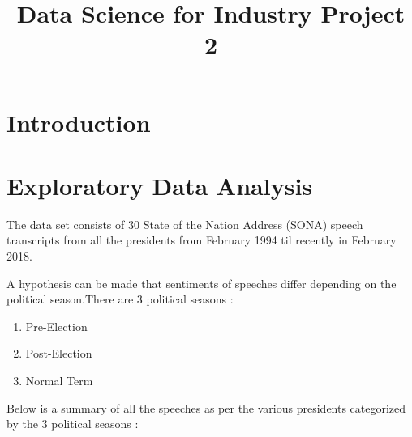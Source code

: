 \documentclass[]{article}
\title{Data Science for Industry Project 2}
\author{}
\date{}
\begin{document}
\maketitle

\section{Introduction}

\section{Exploratory Data Analysis}

The data set consists of 30 State of the Nation Address (SONA) speech
transcripts from all the presidents from February 1994 til recently in
February 2018.

A hypothesis can be made that sentiments of speeches differ depending on
the political season.There are 3 political seasons :

\begin{enumerate}
\item Pre-Election
\item Post-Election
\item Normal Term
\end{enumerate}

Below is a summary of all the speeches as per the various presidents
categorized by the 3 political seasons :
\end{document}

